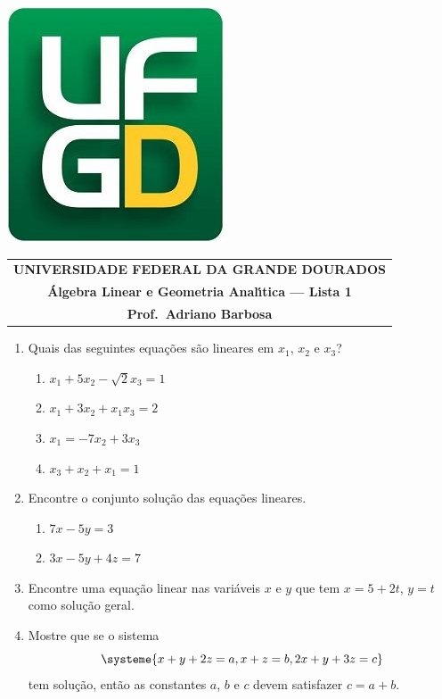 \documentclass[a4paper,5pt]{amsbook}
\begin{document}
\thispagestyle{empty}
\begin{minipage}[h]{0.14\textwidth}
	\includegraphics[scale=0.24]{../../ufgd.png}
\end{minipage}
\begin{minipage}[h]{\textwidth}
\begin{tabular}{c}
{{\bf UNIVERSIDADE FEDERAL DA GRANDE DOURADOS}}\\
{{\bf \'{A}lgebra Linear e Geometria Anal\'{\i}tica --- Lista 1}}\\
{{\bf Prof.\ Adriano Barbosa}}\\
\end{tabular}
\vspace{-0.45cm}
%
\end{minipage}

\vspace{1cm}

\begin{enumerate}
	\vspace{0.5cm}
	\item Quais das seguintes equa\c{c}\~oes s\~ao lineares em $x_1$, $x_2$ e $x_3$?
		\begin{enumerate}
			\item $x_1+5x_2-\sqrt{2}x_3=1$
			\item $x_1+3x_2+x_1x_3=2$
			\item $x_1 = -7x_2+3x_3$
			\item $x_3+x_2+x_1 = 1$
		\end{enumerate}

	\vspace{0.5cm}
	\item Encontre o conjunto solu\c{c}\~ao das equa\c{c}\~oes lineares.
		\begin{enumerate}
			\item $7x-5y=3$
			\item $3x-5y+4z=7$
		\end{enumerate}

	\vspace{0.5cm}
	\item Encontre uma equa\c{c}\~ao linear nas vari\'aveis $x$ e $y$ que tem $x=5+2t$, $y=t$ como solu\c{c}\~ao geral.

	\vspace{0.5cm}
	\item Mostre que se o sistema
		\[\systeme{
				x+y+2z=a,
				x+z=b,
				2x+y+3z=c}\]
	tem solu\c{c}\~ao, ent\~ao as constantes $a$, $b$ e $c$ devem satisfazer $c = a+b$.
\end{enumerate}
\end{document}
